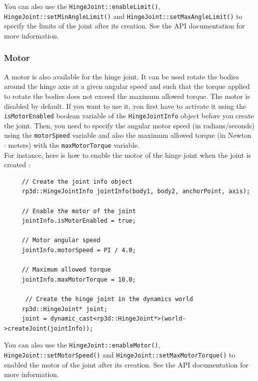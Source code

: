 \documentclass[a4paper,12pt]{article}
\begin{document}
     \vspace{0.6cm}

     You can also use the \texttt{HingeJoint::enableLimit()}, \texttt{HingeJoint::setMinAngleLimit()} and \texttt{HingeJoint::setMaxAngleLimit()} to specify the limits of the joint after its
     creation. See the API documentation for more information.

     \subsubsection{Motor}

     A motor is also available for the hinge joint. It can be used rotate the bodies around the hinge axis at a given angular speed and such that the torque applied to
     rotate the bodies does not exceed the maximum allowed torque. The motor is disabled by default. If you want to use it, you first have to activate it using the
     \texttt{isMotorEnabled} boolean variable of the \texttt{HingeJointInfo} object before you create the joint. Then, you need to specify the angular motor speed (in radians/seconds)
     using the \texttt{motorSpeed} variable and also the maximum allowed torque (in Newton $\cdot$ meters) with the \texttt{maxMotorTorque} variable. \\

     For instance, here is how to enable the motor of the hinge joint when the joint is created : \\

     \begin{lstlisting}
     // Create the joint info object
     rp3d::HingeJointInfo jointInfo(body1, body2, anchorPoint, axis);

     // Enable the motor of the joint
     jointInfo.isMotorEnabled = true;

     // Motor angular speed
     jointInfo.motorSpeed = PI / 4.0;

     // Maximum allowed torque
     jointInfo.maxMotorTorque = 10.0;

      // Create the hinge joint in the dynamics world
     rp3d::HingeJoint* joint;
     joint = dynamic_cast<rp3d::HingeJoint*>(world->createJoint(jointInfo));
  \end{lstlisting}

     \vspace{0.6cm}

     You can also use the \texttt{HingeJoint::enableMotor()}, \texttt{HingeJoint::setMotorSpeed()} and \texttt{HingeJoint::setMaxMotorTorque()} to enabled the motor of the joint after its
     creation. See the API documentation for more information.
\end{document}
